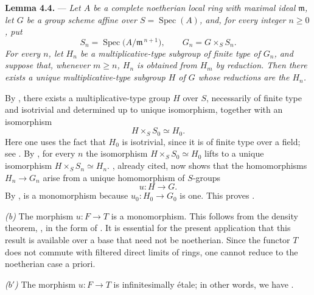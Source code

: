\medskip
\noindent{}\textbf{Lemma 4.4.} ---
\textit{Let \(A\) be a complete noetherian local ring with maximal
ideal \(\mathfrak m\), let \(G\) be a group scheme affine over
\(S=\operatorname{Spec}(A)\), and, for every integer \(n\geq0\), put}
\[
  S_n=\operatorname{Spec}\bigl(A/\mathfrak m^{\,n+1}\bigr),
  \qquad
  G_n=G\times_SS_n.
\]
\textit{For every \(n\), let \(H_n\) be a multiplicative-type
subgroup of finite type of \(G_n\), and suppose that, whenever
\(m\geq n\), \(H_n\) is obtained from \(H_m\) by reduction.  Then
there exists a unique multiplicative-type subgroup \(H\) of \(G\)
whose reductions are the \(H_n\).}

By , there exists a multiplicative-type group \(H\) over
\(S\), necessarily of finite type and isotrivial and determined up
to unique isomorphism, together with an isomorphism
\[
  H\times_SS_0\simeq H_0.
\]
Here one uses the fact that \(H_0\) is isotrivial, since it is of
finite type over a field; see .  By , for
every \(n\) the isomorphism \(H\times_SS_0\simeq H_0\) lifts to a
unique isomorphism \(H\times_SS_n\simeq H_n\).  ,
already cited, now shows that the homomorphisms \(H_n\to G_n\) arise
from a unique homomorphism of \(S\)-groups
\[
  u\colon H\longrightarrow G.
\]
By ,  is a monomorphism because
\(u_0\colon H_0\to G_0\) is one.  This proves
.

\smallskip
\noindent{}\textit{(b)}
The morphism \(u\colon F\to T\) is a monomorphism.  This follows from
the density theorem, , in the form of .  It is essential for the present application that this
result is available over a base that need not be noetherian.  Since
the functor \(T\) does not commute with filtered direct limits of
rings, one cannot reduce to the noetherian case a priori.

\smallskip
\noindent{}
\textit{(\(b'\))} The morphism \(u\colon F\to T\) is infinitesimally
étale; in other words, we have .

